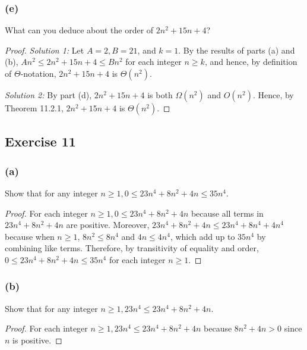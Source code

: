 \documentclass[14pt]{extarticle}
\begin{document}
\subsubsection{(e)}
What can you deduce about the order of \(2n^2 + 15n + 4\)?
\begin{proof}
    {\it Solution 1:} Let \(A = 2, B = 21\), and \(k = 1\). By the results of parts (a) and (b), \(An^2 \leq 2n^2 + 15n + 4 \leq
    Bn^2\) for each integer \(n \geq k\), and hence, by definition of \(\Theta\)-notation, \(2n^2 + 15n + 4\) is \(\Theta(n^2)\).

        {\it Solution 2:} By part (d), \(2n^2 + 15n + 4\) is both \(\Omega(n^2)\) and \(O(n^2)\). Hence, by Theorem 11.2.1,
    \(2n^2 + 15n + 4\) is \(\Theta(n^2)\).
\end{proof}

\subsection{Exercise 11}
\subsubsection{(a)}
Show that for any integer \(n \geq 1, 0 \leq 23n^4 + 8n^2 + 4n \leq 35n^4\).

\begin{proof}
    For each integer \(n \geq 1, 0 \leq 23n^4 + 8n^2 + 4n\) because all terms in \(23n^4 + 8n^2 + 4n\) are positive.
    Moreover, \(23n^4 + 8n^2 + 4n \leq 23n^4 + 8n^4 + 4n^4\) because when \(n \geq 1\), \(8n^2 \leq 8n^4\) and
    \(4n \leq 4n^4\), which add up to \(35n^4\) by combining like terms. Therefore, by transitivity of equality and order,
    \(0 \leq 23n^4 + 8n^2 + 4n \leq 35n^4\) for each integer \(n \geq 1\).
\end{proof}

\subsubsection{(b)}
Show that for any integer \(n \geq 1, 23n^4 \leq 23n^4 + 8n^2 + 4n\).

\begin{proof}
    For each integer \(n \geq 1, 23n^4 \leq 23n^4 + 8n^2 + 4n\) because \(8n^2 + 4n > 0\) since \(n\) is positive.
\end{proof}
\end{document}
